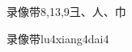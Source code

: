 \begin{entry}{录像带}{8,13,9}{⼹、⼈、⼱}
  \begin{phonetics}{录像带}{lu4xiang4dai4}
  \end{phonetics}
\end{entry}

